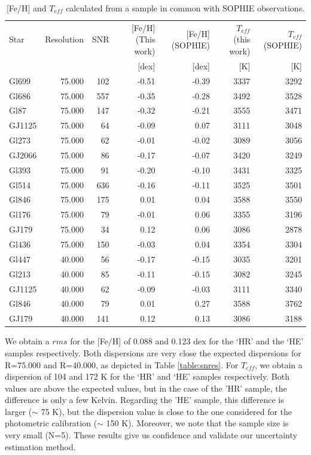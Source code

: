 \documentclass{aa}
\begin{document}
\begin{table}[]
\centering
\caption[]{[Fe/H] and $T_{eff}$ calculated from a sample in common with SOPHIE observations.}
\label{table:sophie}
\begin{center}
\begin{tabular}{l r r r r r r}
\hline
\hline
Star & Resolution & SNR & [Fe/H] (This work) & [Fe/H] (SOPHIE) & $T_{eff}$ (this work) & $T_{eff}$ (SOPHIE) \\
     &            &     &  [dex] & [dex]       &  [K] & [K]       \\
\hline
Gl699 & 75.000 & 102 & -0.51 & -0.39 & 3337 & 3292 \\
Gl686 & 75.000 & 557 & -0.35 & -0.28 & 3492 & 3528 \\
Gl87 & 75.000 & 147 & -0.32 & -0.21 & 3555 & 3471 \\
GJ1125 & 75.000 & 64 & -0.09 & 0.07 & 3111 & 3048 \\
Gl273 & 75.000 & 62 & -0.01 & -0.02 & 3089 & 3056 \\
GJ2066 & 75.000 & 86 & -0.17 & -0.07 & 3420 & 3249 \\
Gl393 & 75.000 & 91 & -0.20 & -0.10 & 3431 & 3325 \\
Gl514 & 75.000 & 636 & -0.16 & -0.11 & 3525 & 3501 \\
Gl846 & 75.000 & 175 & 0.01 & 0.04 & 3588 & 3550 \\
Gl176 & 75.000 & 79 & -0.01 & 0.06 & 3355 & 3196 \\
GJ179 & 75.000 & 34 & 0.12 & 0.06 & 3086 & 2878 \\
Gl436 & 75.000 & 150 & -0.03 & 0.04 & 3354 & 3304 \\
Gl447 & 40.000 & 56 & -0.17 & -0.15 & 3035 & 3201 \\
Gl213 & 40.000 & 85 & -0.11 & -0.15 & 3082 & 3245 \\
GJ1125 & 40.000 & 62 & -0.09 & -0.03 & 3111 & 3340 \\
Gl846 & 40.000 & 79 & 0.01 & 0.27 & 3588 & 3762 \\
GJ179 & 40.000 & 141 & 0.12 & 0.13 & 3086 & 3188 \\
\hline
\end{tabular}
\end{center}
\end{table}

We obtain a $rms$ for the [Fe/H] of 0.088 and 0.123 dex for the `HR' and the `HE' samples respectively. Both dispersions are very close the expected dispersions for R=75.000 and R=40.000, as depicted in Table \ref{table:snres}. For $T_{eff}$, we obtain a dispersion of 104 and 172 K for the `HR' and `HE' samples respectively. Both values are above the expected values, but in the case of the 'HR' sample, the difference is only a few Kelvin. Regarding the 'HE' sample, this difference is larger ($\sim$ 75 K), but the dispersion value is close to the one considered for the photometric calibration ($\sim$ 150 K). Moreover, we note that the sample size is very small (N=5). These results give us confidence and validate our uncertainty estimation method.
\end{document}
